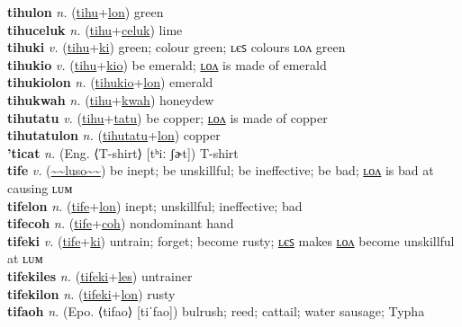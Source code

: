 \textbf{tihulon} \textit{n.} (\hyperref[tihu]{tihu}+\hyperref[lon]{lon})
green \label{tihulon} \\
\textbf{tihuceluk} \textit{n.} (\hyperref[tihu]{tihu}+\hyperref[celuk]{celuk})
lime \label{tihuceluk} \\
\textbf{tihuki} \textit{v.} (\hyperref[tihu]{tihu}+\hyperref[ki]{ki})
green; colour green; ʟєꜱ colours ʟᴏᴧ green \label{tihuki} \\
\textbf{tihukio} \textit{v.} (\hyperref[tihu]{tihu}+\hyperref[kio]{kio})
be emerald; \hyperref[tihukiolon]{ʟᴏᴧ} is made of emerald \label{tihukio} \\
\textbf{tihukiolon} \textit{n.} (\hyperref[tihukio]{tihukio}+\hyperref[lon]{lon})
emerald \label{tihukiolon} \\
\textbf{tihukwah} \textit{n.} (\hyperref[tihu]{tihu}+\hyperref[kwah]{kwah})
honeydew \label{tihukwah} \\
\textbf{tihutatu} \textit{v.} (\hyperref[tihu]{tihu}+\hyperref[tatu]{tatu})
be copper; \hyperref[tihutatulon]{ʟᴏᴧ} is made of copper \label{tihutatu} \\
\textbf{tihutatulon} \textit{n.} (\hyperref[tihutatu]{tihutatu}+\hyperref[lon]{lon})
copper \label{tihutatulon} \\
\textbf{'ticat} \textit{n.} (Eng. ⟨T-shirt⟩ [tʰiː ʃɚt])
T-shirt \label{'ticat} \\
\textbf{tife} \textit{v.} (\hyperref[luso]{\~{}\~{}luso\~{}\~{}})
be inept; be unskillful; be ineffective; be bad; \hyperref[tifelon]{ʟᴏᴧ} is bad at causing ʟᴜᴍ \label{tife} \\
\textbf{tifelon} \textit{n.} (\hyperref[tife]{tife}+\hyperref[lon]{lon})
inept; unskillful; ineffective; bad \label{tifelon} \\
\textbf{tifecoh} \textit{n.} (\hyperref[tife]{tife}+\hyperref[coh]{coh})
nondominant hand \label{tifecoh} \\
\textbf{tifeki} \textit{v.} (\hyperref[tife]{tife}+\hyperref[ki]{ki})
untrain; forget; become rusty; \hyperref[tifekiles]{ʟєꜱ} makes \hyperref[tifekilon]{ʟᴏᴧ} become unskillful at ʟᴜᴍ \label{tifeki} \\
\textbf{tifekiles} \textit{n.} (\hyperref[tifeki]{tifeki}+\hyperref[les]{les})
untrainer \label{tifekiles} \\
\textbf{tifekilon} \textit{n.} (\hyperref[tifeki]{tifeki}+\hyperref[lon]{lon})
rusty \label{tifekilon} \\
\textbf{tifaoh} \textit{n.} (Epo. ⟨tifao⟩ [tiˈfao])
bulrush; reed; cattail; water sausage; Typha \label{tifaoh} \\

